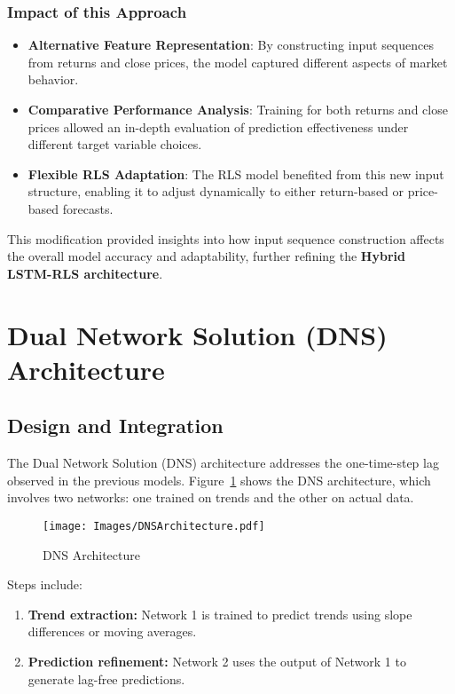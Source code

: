 \subsubsection{Impact of this Approach}

\begin{itemize}
    \item \textbf{Alternative Feature Representation}: By constructing input sequences from returns and close prices, the model captured different aspects of market behavior.  
    \item \textbf{Comparative Performance Analysis}: Training for both returns and close prices allowed an in-depth evaluation of prediction effectiveness under different target variable choices.  
    \item \textbf{Flexible RLS Adaptation}: The RLS model benefited from this new input structure, enabling it to adjust dynamically to either return-based or price-based forecasts.  
\end{itemize}

This modification provided insights into how input sequence construction affects the overall model accuracy and adaptability, further refining the \textbf{Hybrid LSTM-RLS architecture}.

\section{Dual Network Solution (DNS) Architecture}
\subsection{Design and Integration}
The Dual Network Solution (DNS) architecture addresses the one-time-step lag observed in the previous models. Figure~\ref{fig:DNSArch} shows the DNS architecture, which involves two networks: one trained on trends and the other on actual data.

\begin{figure}[h!]
    \centering
    \texttt{[image: Images/DNSArchitecture.pdf]} %
    \caption{DNS Architecture}
    \label{fig:DNSArch}
\end{figure}

Steps include:
\begin{enumerate}
    \item \textbf{Trend extraction:} Network 1 is trained to predict trends using slope differences or moving averages.
    \item \textbf{Prediction refinement:} Network 2 uses the output of Network 1 to generate lag-free predictions.
\end{enumerate}

